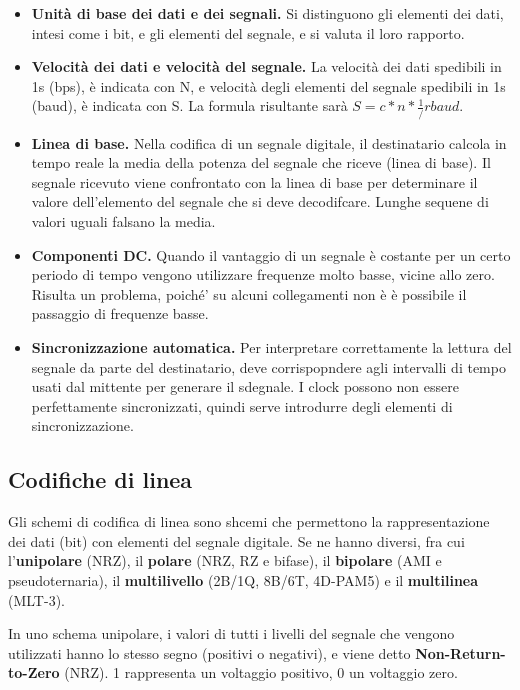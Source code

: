 \begin{itemize}
    \item \textbf{Unità di base dei dati e dei segnali.} Si distinguono gli elementi dei dati, intesi come i bit, e gli elementi del segnale, e si valuta il loro rapporto.
    \item \textbf{Velocità dei dati e velocità del segnale.} La velocità dei dati spedibili in 1s (bps), è indicata con N, e velocità degli elementi del segnale spedibili in 1s (baud), è indicata con S. La formula risultante sarà \(S=c*n*\frac{1}/r baud\).
    \item \textbf{Linea di base.} Nella codifica di un segnale digitale, il destinatario calcola in tempo reale la media della potenza del segnale che riceve (linea di base). Il segnale ricevuto viene confrontato con la linea di base per determinare il valore dell'elemento del segnale  che si deve decodifcare. Lunghe sequene di valori uguali falsano la media.
    \item \textbf{Componenti DC.} Quando il vantaggio di un segnale è costante per un certo periodo di tempo vengono utilizzare frequenze molto basse, vicine allo zero. Risulta un problema, poiché' su alcuni collegamenti non è è possibile il passaggio di frequenze basse.
    \item \textbf{Sincronizzazione automatica.} Per interpretare correttamente la lettura del segnale da parte del destinatario, deve corrispopndere agli intervalli di tempo usati dal mittente per generare il sdegnale. I clock possono non essere perfettamente sincronizzati, quindi serve introdurre degli elementi di sincronizzazione.
\end{itemize}

\subsection{Codifiche di linea}

Gli schemi di codifica di linea sono shcemi che permettono la rappresentazione dei dati (bit) con elementi del segnale digitale. Se ne hanno diversi, fra cui l'\textbf{unipolare} (NRZ), il \textbf{polare} (NRZ, RZ e bifase), il \textbf{bipolare} (AMI e pseudoternaria), il \textbf{multilivello} (2B/1Q, 8B/6T, 4D-PAM5) e il \textbf{multilinea} (MLT-3).

\vspace{3mm}

In uno schema unipolare, i valori di tutti i livelli del segnale che vengono utilizzati hanno lo stesso segno (positivi o negativi), e viene detto \textbf{Non-Return-to-Zero} (NRZ). 1 rappresenta un voltaggio positivo, 0 un voltaggio zero.

